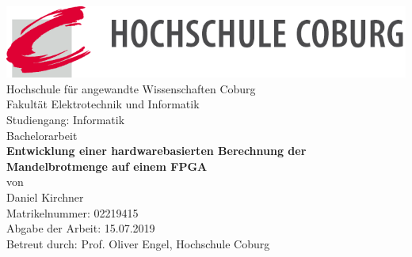 \documentclass[a4paper,12pt,onesided]{report}
\begin{document}

\begin{titlepage}
	\centering
	\includegraphics[width=14.9cm]{img/logo}\\

	\fontsize{18}{20}\selectfont
	Hochschule für angewandte Wissenschaften Coburg\\[.1cm]
	Fakultät Elektrotechnik und Informatik\\[1.2cm]
	Studiengang: Informatik\\
	Bachelorarbeit\\[1.2cm]
	\fontsize{21}{23}\selectfont
	\textbf{Entwicklung einer hardwarebasierten Berechnung der 
	Mandelbrotmenge auf einem FPGA}\\[1cm]
	\fontsize{18}{20}\selectfont
	von\\[1.2cm]
	Daniel Kirchner\\
	Matrikelnummer: 02219415\\[1.2cm]
	Abgabe der Arbeit: 15.07.2019\\[1.2cm]

	Betreut durch: Prof. Oliver Engel, Hochschule Coburg
\end{titlepage}
\end{document}
